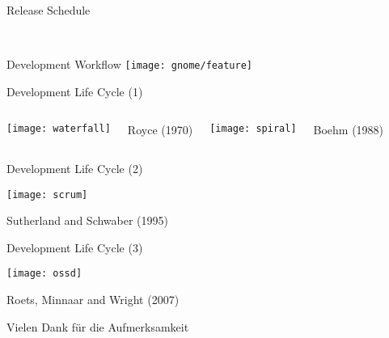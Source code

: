 \documentclass[11pt]{beamer}
\newlength{\colwidth}
\begin{document}
\begin{frame}{Release Schedule}
  \vspace{-1.4em}
\begin{figure}[htbp]
  \centering
   \\

\end{figure}
\end{frame}

\begin{frame}{Development Workflow}
  \texttt{[image: gnome/feature]}
\end{frame}


\begin{frame}{Development Life Cycle (1)}
  \begin{center}
  \begin{columns}
  \column{\colwidth}
  \texttt{[image: waterfall]}

  {\tiny\hfill
  Royce (1970)
  }

  \column{\colwidth}
  \texttt{[image: spiral]}

  {\tiny\hfill
  Boehm (1988)
  }

  \end{columns}
  \end{center}
\end{frame}

\begin{frame}{Development Life Cycle (2)}
  \begin{center}

    \texttt{[image: scrum]}

    {\tiny\hfill
    Sutherland and Schwaber (1995)
    }
  \end{center}
\end{frame}

\begin{frame}{Development Life Cycle (3)}
  \begin{center}
    \texttt{[image: ossd]}

    {\tiny\hfill
    Roets, Minnaar and Wright (2007)
    }
  \end{center}
\end{frame}

\begin{frame}
  \begin{center}
  {\Huge Vielen Dank für die Aufmerksamkeit}
  \end{center}
\end{frame}
\end{document}
